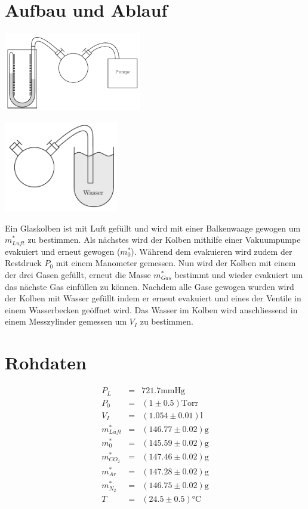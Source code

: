 \documentclass[12pt,a4paper]{article}
\begin{document}
\section*{Aufbau und Ablauf}
\begin{multicols}{2}
\includegraphics[width=6cm]{vakuum.pdf}

\includegraphics[width=5cm]{wasser.pdf}
\end{multicols}

\noindent
Ein Glaskolben ist mit Luft gefüllt und wird mit einer Balkenwaage gewogen um $m^*_{Luft}$ zu bestimmen. Als nächstes wird der Kolben mithilfe einer Vakuumpumpe evakuiert und erneut gewogen ($m^*_0$). Während dem evakuieren wird zudem der Restdruck $P_0$ mit einem Manometer gemessen. Nun wird der Kolben mit einem der drei Gasen gefüllt, erneut die Masse $m^*_{Gas}$ bestimmt und wieder evakuiert um das nächste Gas einfüllen zu können. Nachdem alle Gase gewogen wurden wird der Kolben mit Wasser gefüllt indem er erneut evakuiert und eines der Ventile in einem Wasserbecken geöffnet wird. Das Wasser im Kolben wird anschliessend in einem Messzylinder gemessen um $V_I$ zu bestimmen.

\section*{Rohdaten}
\begin{eqnarray*}
P_L & = & 721.7 \mbox{mmHg} \\
P_0 & = & (1 \pm 0.5) \mbox{Torr} \\
V_I & = & (1.054 \pm 0.01) \mbox{l} \\
m^*_{Luft} & = & (146.77 \pm 0.02) \mbox{g} \\
m^*_{0} & = & (145.59 \pm 0.02)  \mbox{g} \\
m^*_{CO_2} & = & (147.46 \pm 0.02)  \mbox{g} \\
m^*_{Ar} & = & (147.28 \pm 0.02)  \mbox{g} \\
m^*_{N_2} & = & (146.75 \pm 0.02) \mbox{g} \\
T & = & (24.5 \pm 0.5)\mbox{°C}
\end{eqnarray*}
\end{document}
